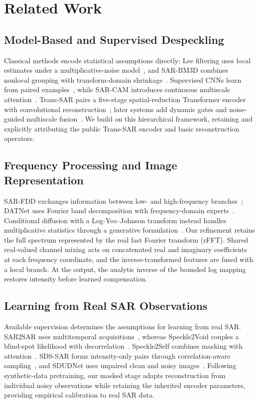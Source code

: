 \documentclass[conference]{IEEEtran}
\begin{document}
\section{Related Work}
\subsection{Model-Based and Supervised Despeckling}
Classical methods encode statistical assumptions directly: Lee filtering uses local estimates under a multiplicative-noise model~\cite{lee1980}, and SAR-BM3D combines nonlocal grouping with transform-domain shrinkage~\cite{parrilli2012}. Supervised CNNs learn from paired examples~\cite{chierchia2017}, while SAR-CAM introduces continuous multiscale attention~\cite{ko2022}. Trans-SAR pairs a five-stage spatial-reduction Transformer encoder with convolutional reconstruction~\cite{perera2022}; later systems add dynamic gates and noise-guided multiscale fusion~\cite{shen2025,zhang2025}. We build on this hierarchical framework, retaining and explicitly attributing the public Trans-SAR encoder and basic reconstruction operators.

\subsection{Frequency Processing and Image Representation}
SAR-FDD exchanges information between low- and high-frequency branches~\cite{zhao2024}; DATNet uses Fourier band decomposition with frequency-domain experts~\cite{shen2025}. Conditional diffusion with a Log-Yeo--Johnson transform instead handles multiplicative statistics through a generative formulation~\cite{ma2024}. Our refinement retains the full spectrum represented by the real fast Fourier transform (rFFT). Shared real-valued channel mixing acts on concatenated real and imaginary coefficients at each frequency coordinate, and the inverse-transformed features are fused with a local branch. At the output, the analytic inverse of the bounded log mapping restores intensity before learned compensation.

\subsection{Learning from Real SAR Observations}
Available supervision determines the assumptions for learning from real SAR. SAR2SAR uses multitemporal acquisitions~\cite{dalsasso2021}, whereas Speckle2Void couples a blind-spot likelihood with decorrelation~\cite{molini2022}. Speckle2Self combines masking with attention~\cite{lin2025}. SDS-SAR forms intensity-only pairs through correlation-aware sampling~\cite{chen2026}, and SDUDNet uses unpaired clean and noisy images~\cite{bo2025}. Following synthetic-data pretraining, our masked stage adapts reconstruction from individual noisy observations while retaining the inherited encoder parameters, providing empirical calibration to real SAR data.
\end{document}
